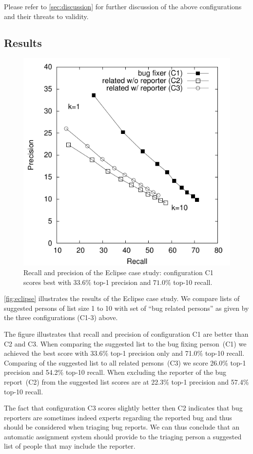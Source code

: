 Please refer to \autoref{sec:discussion} for further discussion of the above configurations and their threats to validity.

\subsection{Results}\label{therealthing}

\begin{figure}
	\center
    \includegraphics[width=0.61\linewidth]{fig/devlect-test-set}
    \caption{Recall and precision of the Eclipse case study: configuration C1 scores best with $33.6\%$ top-1 precision and $71.0\%$ top-10 recall.}
    \label{fig:eclipse}
\end{figure} 

\autoref{fig:eclipse} illustrates the results of the Eclipse case study. We compare lists of suggested persons of list size 1 to 10 with set of ``bug related persons'' as given by the three configurations (C1-3) above.

The figure illustrates that recall and precision of configuration C1 are better than C2 and C3. When comparing the suggested list to the bug fixing person~(C1) we achieved the best score with 33.6\% top-1 precision only and 71.0\% top-10 recall. Comparing of the suggested list to all related persons~(C3) we score 26.0\% top-1 precision and 54.2\% top-10 recall. When excluding the reporter of the bug report~(C2) from the suggested list scores are at 22.3\% top-1 precision and 57.4\% top-10 recall.

The fact that configuration C3 scores slightly better then C2 indicates that bug reporters are sometimes indeed experts regarding the reported bug and thus should be considered when triaging bug reports. We can thus conclude that an automatic assignment system should provide to the triaging person a suggested list of people that may include the reporter.

